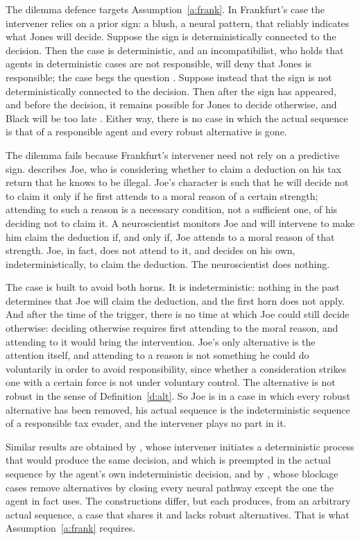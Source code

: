 \documentclass{situationist-preprint}
\begin{document}
The dilemma defence targets Assumption~\ref{a:frank}. In Frankfurt's case the intervener relies on a prior sign: a blush, a neural pattern, that reliably indicates what Jones will decide. Suppose the sign is deterministically connected to the decision. Then the case is deterministic, and an incompatibilist, who holds that agents in deterministic cases are not responsible, will deny that Jones is responsible; the case begs the question \citep{Widerker1995}. Suppose instead that the sign is not deterministically connected to the decision. Then after the sign has appeared, and before the decision, it remains possible for Jones to decide otherwise, and Black will be too late \citep{Kane1996,Ginet1996}. Either way, there is no case in which the actual sequence is that of a responsible agent and every robust alternative is gone.

The dilemma fails because Frankfurt's intervener need not rely on a predictive sign. \citet{Pereboom2001} describes Joe, who is considering whether to claim a deduction on his tax return that he knows to be illegal. Joe's character is such that he will decide not to claim it only if he first attends to a moral reason of a certain strength; attending to such a reason is a necessary condition, not a sufficient one, of his deciding not to claim it. A neuroscientist monitors Joe and will intervene to make him claim the deduction if, and only if, Joe attends to a moral reason of that strength. Joe, in fact, does not attend to it, and decides on his own, indeterministically, to claim the deduction. The neuroscientist does nothing.

The case is built to avoid both horns. It is indeterministic: nothing in the past determines that Joe will claim the deduction, and the first horn does not apply. And after the time of the trigger, there is no time at which Joe could still decide otherwise: deciding otherwise requires first attending to the moral reason, and attending to it would bring the intervention. Joe's only alternative is the attention itself, and attending to a reason is not something he could do voluntarily in order to avoid responsibility, since whether a consideration strikes one with a certain force is not under voluntary control. The alternative is not robust in the sense of Definition~\ref{d:alt}. So Joe is in a case in which every robust alternative has been removed, his actual sequence is the indeterministic sequence of a responsible tax evader, and the intervener plays no part in it.

Similar results are obtained by \citet{MeleRobb1998}, whose intervener initiates a deterministic process that would produce the same decision, and which is preempted in the actual sequence by the agent's own indeterministic decision, and by \citet{Hunt2000}, whose blockage cases remove alternatives by closing every neural pathway except the one the agent in fact uses. The constructions differ, but each produces, from an arbitrary actual sequence, a case that shares it and lacks robust alternatives. That is what Assumption~\ref{a:frank} requires.
\end{document}
